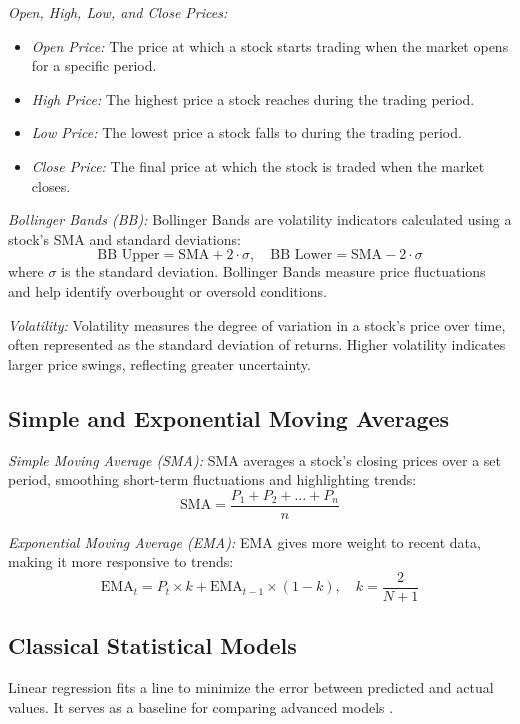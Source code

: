 \documentclass[10pt,twocolumn]{article}
\begin{document}
\textit{Open, High, Low, and Close Prices:}  
\begin{itemize}
    \item \textit{Open Price:} The price at which a stock starts trading when the market opens for a specific period.
    \item \textit{High Price:} The highest price a stock reaches during the trading period.
    \item \textit{Low Price:} The lowest price a stock falls to during the trading period.
    \item \textit{Close Price:} The final price at which the stock is traded when the market closes.
\end{itemize}

\textit{Bollinger Bands (BB):}  
Bollinger Bands are volatility indicators calculated using a stock's SMA and standard deviations:
\[
\text{BB Upper} = \text{SMA} + 2 \cdot \sigma, \quad \text{BB Lower} = \text{SMA} - 2 \cdot \sigma
\]
where \(\sigma\) is the standard deviation. Bollinger Bands measure price fluctuations and help identify overbought or oversold conditions.

\textit{Volatility:}  
Volatility measures the degree of variation in a stock's price over time, often represented as the standard deviation of returns. Higher volatility indicates larger price swings, reflecting greater uncertainty.

\subsection{Simple and Exponential Moving Averages}
\textit{Simple Moving Average (SMA):}  
SMA averages a stock's closing prices over a set period, smoothing short-term fluctuations and highlighting trends:
\[
\text{SMA} = \frac{P_1 + P_2 + \dots + P_n}{n}
\]

\textit{Exponential Moving Average (EMA):}  
EMA gives more weight to recent data, making it more responsive to trends:
\[
\text{EMA}_t = P_t \times k + \text{EMA}_{t-1} \times (1 - k), \quad k = \frac{2}{N+1}
\]

\subsection{Classical Statistical Models}

Linear regression fits a line to minimize the error between predicted and actual values. It serves as a baseline for comparing advanced models \cite{James2021IntroStatLearning}.
\end{document}
